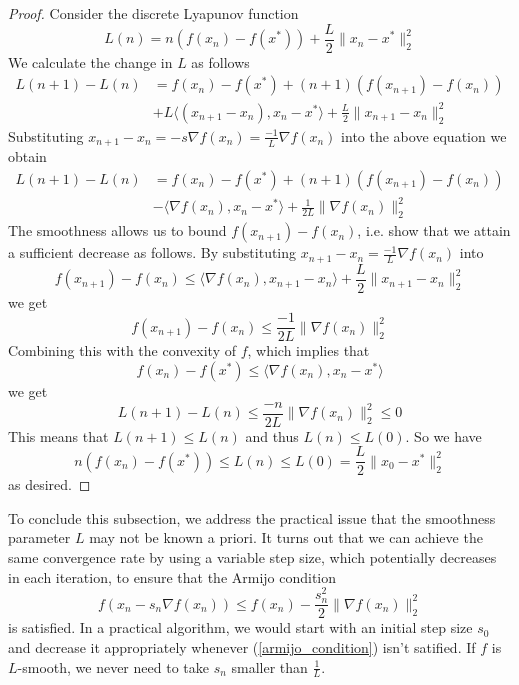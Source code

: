 \begin{proof}
  Consider the discrete Lyapunov function
  \begin{equation}
   L(n) = n(f(x_n) - f(x^*)) + \frac{L}{2}\|x_n - x^*\|_2^2
  \end{equation}
  We calculate the change in $L$ as follows
  \begin{align}
   L(n+1) - L(n) &= f(x_n) - f(x^*) + (n+1)(f(x_{n+1}) - f(x_n))\\
   & + L\langle(x_{n+1} - x_n), x_n - x^*\rangle + \frac{L}{2}\|x_{n+1} - x_n\|_2^2
  \end{align}
 Substituting $x_{n+1} - x_n = -s\nabla f(x_n) = \frac{-1}{L}\nabla f(x_n)$ into the above equation
 we obtain
  \begin{align}
   L(n+1) - L(n) &= f(x_n) - f(x^*) + (n+1)(f(x_{n+1}) - f(x_n))\\
   & - \langle\nabla f(x_n), x_n - x^*\rangle + \frac{1}{2L}\|\nabla f(x_n)\|_2^2
  \end{align}
  The smoothness allows us to bound $f(x_{n+1}) - f(x_n)$, i.e. show that we attain a sufficient decrease as follows.
  By substituting $x_{n+1} - x_n = \frac{-1}{L}\nabla f(x_n)$ into
  \begin{equation}
   f(x_{n+1}) - f(x_n) \leq \langle\nabla f(x_n), x_{n+1} - x_n\rangle + \frac{L}{2}\|x_{n+1} - x_n\|_2^2
  \end{equation}
  we get
  \begin{equation}
   f(x_{n+1}) - f(x_n) \leq \frac{-1}{2L}\|\nabla f(x_n)\|_2^2
  \end{equation}
  Combining this with the convexity of $f$, which implies that
  \begin{equation}
   f(x_n) - f(x^*) \leq \langle\nabla f(x_n), x_n - x^*\rangle
  \end{equation}
  we get
  \begin{equation}
   L(n+1) - L(n) \leq \frac{-n}{2L}\|\nabla f(x_n)\|_2^2 \leq 0
  \end{equation}
  This means that $L(n+1)\leq L(n)$ and thus $L(n) \leq L(0)$. So we have
  \begin{equation}
   n(f(x_n) - f(x^*)) \leq L(n) \leq L(0) = \frac{L}{2}\|x_0 - x^*\|_2^2
  \end{equation}
  as desired.

 \end{proof}
 
 To conclude this subsection, we address the practical issue that the smoothness parameter $L$ may not be known a priori.
 It turns out that we can achieve the same convergence rate by using a variable step size, which potentially decreases 
 in each iteration, to ensure that the Armijo condition
 \begin{equation}\label{armijo_condition}
  f(x_n - s_n\nabla f(x_n)) \leq f(x_n) - \frac{s_n^2}{2}\|\nabla f(x_n)\|_2^2
 \end{equation}
 is satisfied. In a practical algorithm, we would start with an initial step size $s_0$ and decrease it appropriately whenever
 (\ref{armijo_condition}) isn't satified. If $f$ is $L$-smooth, we never need to take $s_n$ smaller than $\frac{1}{L}$.
 
